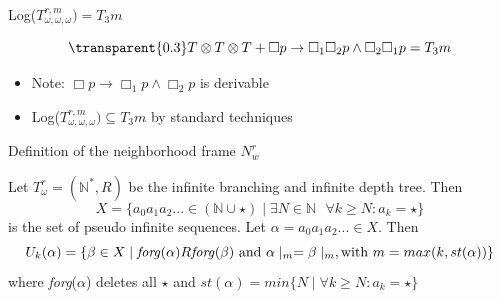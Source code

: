 \begin{frame}{Log($T_{\omega,\omega,\omega}^{r,m}) = T_3m$}
\begin{figure}[t]
\end{figure}
\[ 
	{\transparent{0.3} T \otimes T \otimes T + \Box p \to \Box_1\Box_2 p \land \Box_2\Box_1 p = T_3m }
 \]
\pause

\begin{itemize}
    \item Note: $\Box p \to \Box_1 p \land \Box_2p$ is derivable
    \item Log($T_{\omega,\omega,\omega}^{r,m}) \subseteq T_3m$ by standard techniques
\end{itemize}
\end{frame}

\begin{frame}{Definition of the neighborhood frame $N_w^r$}
    \begin{definition}
        Let $T_{\omega}^{r} = (\mathbb{N}^*, R)$ be the infinite branching  and infinite depth tree. Then
		\[
		X = \{a_0a_1a_2... \in (\mathbb{N} \cup \star) \mid \exists N \in \mathbb{N} \mbox{ }\forall k\geq N: a_k = \star\}
		\]
		is the set of pseudo infinite sequences. \pause 
		Let $\alpha =a_0a_1a_2... \in X$. Then 
		\[
		U_k(\alpha) = \{\beta \in X \mid {\mbox{\emph{forg}}}(\alpha) R \mbox{}\mbox{\emph{forg}}(\beta) \mbox{ and } \alpha \mid_m = \beta \mid_m,	 \mbox{with } m = max(k,st(\alpha))\} 
		\]
		where \emph{forg}($\alpha$) deletes all $\star$ and $st(\alpha) = min\{N \mid \forall k \geq N: a_k = \star\}$
    \end{definition}
\end{frame}

